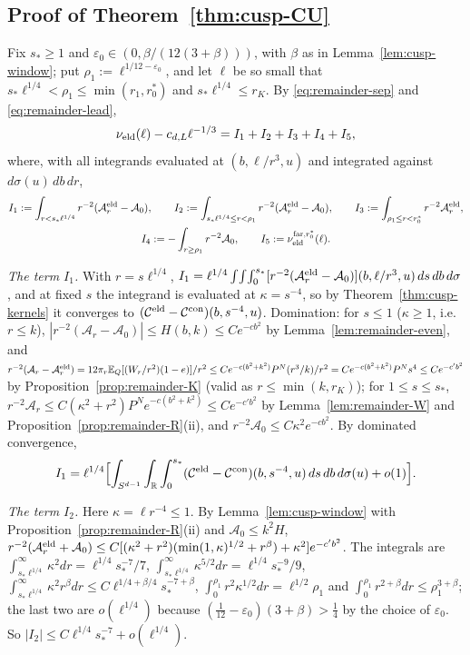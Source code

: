 \subsection{Proof of Theorem~\ref{thm:cusp-CU}}\label{ssec:cusp-proof}

Fix $s_*\ge1$ and $\varepsilon_0\in(0,\beta/(12(3+\beta)))$, with $\beta$ as in Lemma~\ref{lem:cusp-window}; put $\rho_1:=\ell^{1/12-\varepsilon_0}$, and let $\ell$ be so small that $s_*\ell^{1/4}<\rho_1\le\min(r_1,r_0^*)$ and $s_*\ell^{1/4}\le r_K$. By \eqref{eq:remainder-sep} and \eqref{eq:remainder-lead},
\[
\nu_{\mathrm{eld}}(\ell)-c_{d,L}\ell^{-1/3}=I_1+I_2+I_3+I_4+I_5,
\]
where, with all integrands evaluated at $(b,\ell/r^3,u)$ and integrated against $d\sigma(u)\,db\,dr$,
\[
\begin{gathered}
I_1:=\int_{r<s_*\ell^{1/4}}r^{-2}(\mathcal A^{\mathrm{eld}}_r-\mathcal A_0),\qquad I_2:=\int_{s_*\ell^{1/4}\le r<\rho_1}r^{-2}(\mathcal A^{\mathrm{eld}}_r-\mathcal A_0),\qquad I_3:=\int_{\rho_1\le r<r_0^*}r^{-2}\mathcal A^{\mathrm{eld}}_r,\\
I_4:=-\int_{r\ge\rho_1}r^{-2}\mathcal A_0,\qquad I_5:=\nu_{\mathrm{eld}}^{\mathrm{far},r_0^*}(\ell).
\end{gathered}
\]

\emph{The term $I_1$.} With $r=s\ell^{1/4}$, $I_1=\ell^{1/4}\int\!\int\!\int_0^{s_*}[r^{-2}(\mathcal A^{\mathrm{eld}}_r-\mathcal A_0)](b,\ell/r^3,u)\,ds\,db\,d\sigma$, and at fixed $s$ the integrand is evaluated at $\kappa=s^{-4}$, so by Theorem~\ref{thm:cusp-kernels} it converges to $(\mathcal C^{\mathrm{eld}}-\mathcal C^{\mathrm{con}})(b,s^{-4},u)$. Domination: for $s\le1$ ($\kappa\ge1$, i.e.\ $r\le k$), $|r^{-2}(\mathcal A_r-\mathcal A_0)|\le H(b,k)\le Ce^{-cb^2}$ by Lemma~\ref{lem:remainder-even}, and $r^{-2}(\mathcal A_r-\mathcal A^{\mathrm{eld}}_r)=12\pi_r\mathbb E_Q[(W_r/r^2)(1-e)]/r^2\le Ce^{-c(b^2+k^2)}P^N(r^3/k)/r^2=Ce^{-c(b^2+k^2)}P^Ns^4\le Ce^{-c'b^2}$ by Proposition~\ref{prop:remainder-K} (valid as $r\le\min(k,r_K)$); for $1\le s\le s_*$, $r^{-2}\mathcal A_r\le C(\kappa^2+r^2)P^Ne^{-c(b^2+k^2)}\le Ce^{-c'b^2}$ by Lemma~\ref{lem:remainder-W} and Proposition~\ref{prop:remainder-R}(ii), and $r^{-2}\mathcal A_0\le C\kappa^2e^{-cb^2}$. By dominated convergence,
\[
I_1=\ell^{1/4}\Bigl[\int_{S^{d-1}}\int_\mathbb R\int_0^{s_*}(\mathcal C^{\mathrm{eld}}-\mathcal C^{\mathrm{con}})(b,s^{-4},u)\,ds\,db\,d\sigma(u)+o(1)\Bigr].
\]

\emph{The term $I_2$.} Here $\kappa=\ell r^{-4}\le1$. By Lemma~\ref{lem:cusp-window} with Proposition~\ref{prop:remainder-R}(ii) and $\mathcal A_0\le k^2H$, $r^{-2}(\mathcal A^{\mathrm{eld}}_r+\mathcal A_0)\le C[(\kappa^2+r^2)(\min(1,\kappa)^{1/2}+r^\beta)+\kappa^2]e^{-c'b^2}$. The integrals are $\int_{s_*\ell^{1/4}}^\infty\kappa^2dr=\ell^{1/4}s_*^{-7}/7$, $\int_{s_*\ell^{1/4}}^\infty\kappa^{5/2}dr=\ell^{1/4}s_*^{-9}/9$, $\int_{s_*\ell^{1/4}}^\infty\kappa^2r^\beta dr\le C\ell^{1/4+\beta/4}s_*^{-7+\beta}$, $\int_0^{\rho_1}r^2\kappa^{1/2}dr=\ell^{1/2}\rho_1$ and $\int_0^{\rho_1}r^{2+\beta}dr\le\rho_1^{3+\beta}$; the last two are $o(\ell^{1/4})$ because $(\frac1{12}-\varepsilon_0)(3+\beta)>\frac14$ by the choice of $\varepsilon_0$. So $|I_2|\le C\ell^{1/4}s_*^{-7}+o(\ell^{1/4})$.

